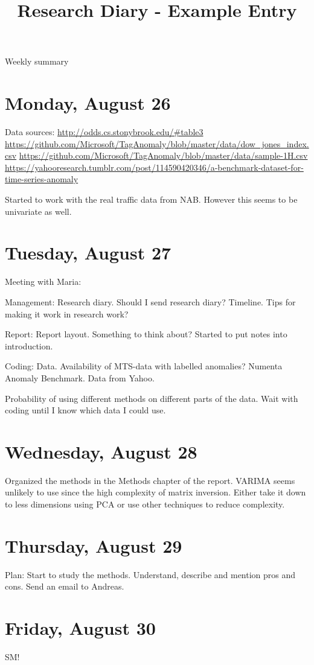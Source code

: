 \documentclass[11pt,letterpaper]{article}
\begin{document}
\univlogo

\title{Research Diary - Example Entry}

{\Huge Weekly summary}\\[5mm]

\section*{Monday, August 26}

Data sources: \newline
\url{http://odds.cs.stonybrook.edu/#table3}
\url{https://github.com/Microsoft/TagAnomaly/blob/master/data/dow_jones_index.csv}
\url{https://github.com/Microsoft/TagAnomaly/blob/master/data/sample-1H.csv}
\url{https://yahooresearch.tumblr.com/post/114590420346/a-benchmark-dataset-for-time-series-anomaly}

Started to work with the real traffic data from NAB. However this seems to be univariate as well. 

\section*{Tuesday, August 27}

Meeting with Maria:

Management:
Research diary. Should I send research diary?
Timeline. Tips for making it work in research work?

Report:
Report layout. Something to think about? 
Started to put notes into introduction.

Coding:
Data. Availability of MTS-data with labelled anomalies?
Numenta Anomaly Benchmark.
Data from Yahoo.

Probability of using different methods on different parts of the data. Wait with coding until I know which data I could use. 

\section*{Wednesday, August 28}

Organized the methods in the Methods chapter of the report. VARIMA seems unlikely to use since the high complexity of matrix inversion. Either take it down to less dimensions using PCA or use other techniques to reduce complexity. 

\section*{Thursday, August 29}

Plan: 
Start to study the methods. Understand, describe and mention pros and cons.
Send an email to Andreas.

\section*{Friday, August 30}
SM!

\printbibliography
\end{document}
